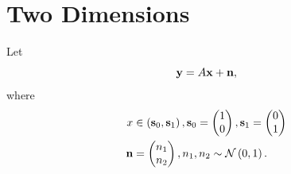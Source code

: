 \section{Two Dimensions}
Let 
\begin{equation}
\mathbf{y} = A\mathbf{x} + \mathbf{n},
\end{equation}
where 
\begin{align}
x &\in \left(\mathbf{s}_0,\mathbf{s}_1\right), 
\mathbf{s}_0 = 
\begin{pmatrix}
1 
\\
0
\end{pmatrix},
\mathbf{s}_1 = 
\begin{pmatrix}
0 
\\
1
\end{pmatrix}
\\
\mathbf{n} &= 
\begin{pmatrix}
n_1
\\
n_2
\end{pmatrix},
n_1,n_2 \sim \mathcal{N}\left(0,1\right).
\end{align}
%
